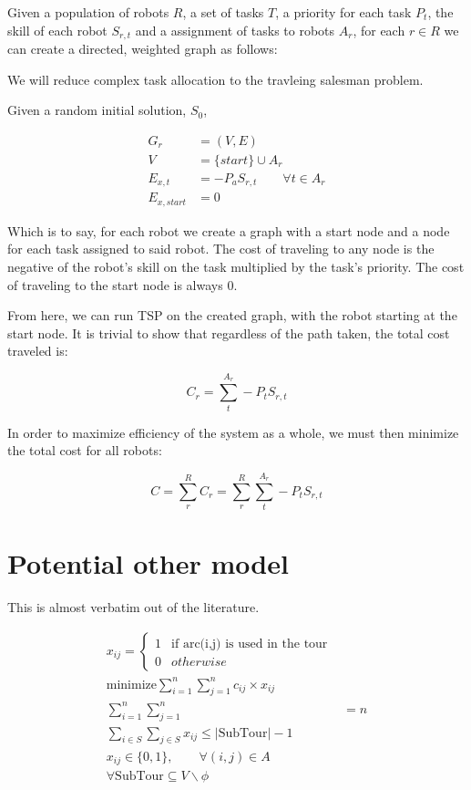 \documentclass[a4paper]{article}
\begin{document}
Given a population of robots $R$, a set of tasks $T$, a priority for each task $P_t$, the
skill of each robot $S_{r,t}$ and a assignment of tasks to robots $A_r$, for each $r \in R$
we can create a directed, weighted graph as follows:

We will reduce complex task allocation to the travleing salesman problem.

Given a random initial solution, $S_0$,

\begin{align*}
	G_r &= (V, E) \\
	V &= \{ start \} \cup A_r \\
	E_{x, t} &= -P_a S_{r,t} \qquad \forall t \in A_r \\
	E_{x, start} &= 0
\end{align*}

Which is to say, for each robot we create a graph with a start node and a node for each task assigned to said robot. The cost of traveling to any node is the negative of the robot's skill on the task multiplied by the task's priority. The cost of traveling to the start node is always 0.

From here, we can run TSP on the created graph, with the robot starting at the start node. It is trivial to show that regardless of the path taken, the total cost traveled is:

$$C_r = \sum_t^{A_r} -P_t S_{r,t}$$

In order to maximize efficiency of the system as a whole, we must then minimize the total cost for all robots:

$$C = \sum_r^{R} C_r = \sum_r^{R} \sum_t^{A_r} -P_t S_{r,t}$$

\section{Potential other model}

This is almost verbatim out of the literature.

\begin{align}
x_{ij} = \begin{cases}
      1 & \text{if arc(i,j) is used in the tour} \\
      0 & otherwise
   \end{cases} \\
\text{minimize} \sum_{i=1}^n \sum_{j=1}^n c_{ij} \times x_{ij} \\
\sum_{i=1}^n \sum_{j=1}^n &= n \\
\sum_{i \in S} \sum_{j \in S} x_{ij} \le |\text{SubTour}| - 1 \\
x_{ij} \in \{0, 1\},\qquad \forall (i, j) \in A \\
\forall \text{SubTour} \subseteq V \backslash \phi
\end{align}
\end{document}
